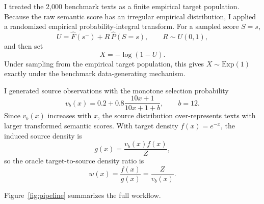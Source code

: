 \documentclass[11pt]{article}
\begin{document}
I treated the 2,000 benchmark texts as a finite empirical target population. Because the raw semantic score has an irregular empirical distribution, I applied a randomized empirical probability-integral transform. For a sampled score $S=s$,
\[
U=\widehat F(s^-)+R\,\widehat P(S=s),\qquad R\sim U(0,1),
\]
and then set
\[
X=-\log(1-U).
\]
Under sampling from the empirical target population, this gives $X\sim\mathrm{Exp}(1)$ exactly under the benchmark data-generating mechanism.

I generated source observations with the monotone selection probability
\[
v_b(x)=0.2+0.8\frac{10x+1}{10x+1+b},\qquad b=12.
\]
Since $v_b(x)$ increases with $x$, the source distribution over-represents texts with larger transformed semantic scores. With target density $f(x)=e^{-x}$, the induced source density is
\[
g(x)=\frac{v_b(x)f(x)}{Z},
\]
so the oracle target-to-source density ratio is
\[
w(x)=\frac{f(x)}{g(x)}=\frac{Z}{v_b(x)}.
\]

Figure~\ref{fig:pipeline} summarizes the full workflow.
\end{document}
